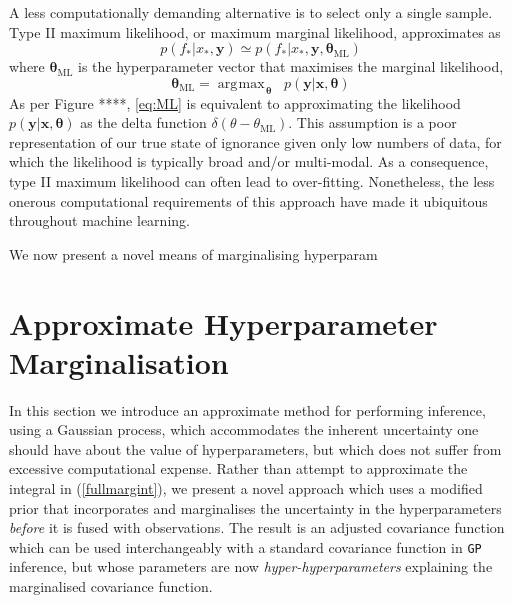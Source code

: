 \documentclass{article}
\newcommand{\xd}{\mathbf{x}}
\newcommand{\yd}{\mathbf{y}}
\DeclareMathOperator*{\argmax}{\arg\!\max\!}
\begin{document}
A less computationally demanding alternative is to select only a single sample. Type II maximum likelihood, or maximum marginal likelihood, approximates as
\begin{equation} \label{eq:ML}
p(f_* |x_*, \yd) \simeq p(f_* | x_*, \yd,\bm{\theta}_{\mathrm{ML}})
\end{equation}
where $\bm{\theta}_{\mathrm{ML}}$ is the hyperparameter vector that maximises the marginal likelihood, 
\begin{equation}
\bm{\theta}_{\mathrm{ML}} = \argmax_{\bm{\theta}} \;\; p(\yd|\xd,\bm{\theta})
\end{equation}
As per Figure ****, \eqref{eq:ML} is equivalent to approximating the likelihood $p(\yd|\xd,\bm{\theta})$ as the delta function $\delta(\theta - \theta_{\mathrm{ML}})$. This assumption is a poor representation of our true state of ignorance given only low numbers of data, for which the likelihood is typically broad and/or multi-modal. As a consequence, type II maximum likelihood can often lead to over-fitting. Nonetheless, the less onerous computational requirements of this approach have made it ubiquitous throughout machine learning. 

We now present a novel means of marginalising hyperparam

\section{Approximate Hyperparameter Marginalisation}

In this section we introduce an approximate method for performing inference, using a Gaussian process, which accommodates the inherent uncertainty one should have about the value of hyperparameters, but which does not suffer from excessive computational expense. Rather than attempt to approximate the integral in (\ref{fullmargint}), we present a novel approach which uses a modified prior that incorporates and marginalises the uncertainty in the hyperparameters \emph{before} it is fused with observations. The result is an adjusted covariance function which can be used interchangeably with a standard covariance function in \verb"GP" inference, but whose parameters are now \emph{hyper-hyperparameters} explaining the marginalised covariance function.
\end{document}
